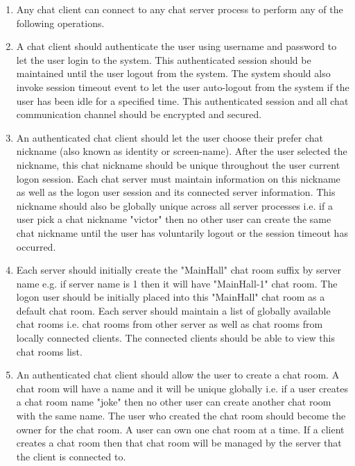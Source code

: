 \documentclass[dareport.tex]{subfiles}
\begin{document}
\begin{enumerate}[leftmargin=*]
\item Any chat client can connect to any chat server process to perform any of the following operations.

\item A chat client should authenticate the user using username and password to let the user login to the system. This authenticated session should be maintained until the user logout from the system. The system should also invoke session timeout event to let the user auto-logout from the system if the user has been idle for a specified time. This authenticated session and all chat communication channel should be encrypted and secured. 

\item An authenticated chat client should let the user choose their prefer chat nickname (also known as identity or screen-name). After the user selected the nickname, this chat nickname should be unique throughout the user current logon session. Each chat server must maintain information on this nickname as well as the logon user session and its connected server information. This nickname should also be globally unique across all server processes i.e. if a user pick a chat nickname "victor" then no other user can create the same chat nickname until the user has voluntarily logout or the session timeout has occurred.

\item Each server should initially create the "MainHall" chat room suffix by server name e.g. if server name is 1 then it will have "MainHall-1" chat room. The logon user should be initially placed into this "MainHall" chat room as a default chat room. Each server should maintain a list of globally available chat rooms i.e. chat rooms from other server as well as chat rooms from locally connected clients. The connected clients should be able to view this chat rooms list.

\item An authenticated chat client should allow the user to create a chat room. A chat room will have a name and it will be unique globally i.e. if a user creates a chat room name "joke" then no other user can create another chat room with the same name. The user who created the chat room should become the owner for the chat room. A user can own one chat room at a time. If a client creates a chat room then that chat room will be managed by the server that the client is connected to.


\end{enumerate}
\end{document}
